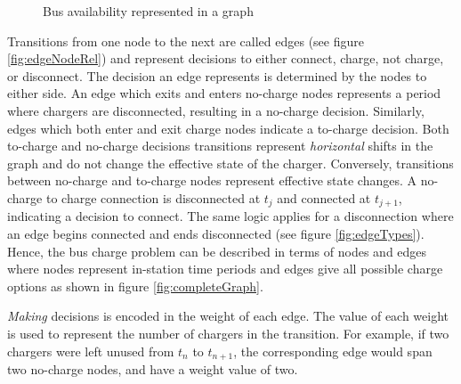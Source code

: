 \begin{figure*}
{
	}
		\caption{Bus availability represented in a graph}
		\label{fig:busAvailComparison}
\end{figure*}

\par Transitions from one node to the next are called edges (see figure \ref{fig:edgeNodeRel}) and represent decisions to either connect, charge, not charge, or disconnect. The decision an edge represents is determined by the nodes to either side. An edge which exits and enters no-charge nodes represents a period where chargers are disconnected, resulting in a no-charge decision. Similarly, edges which both enter and exit charge nodes indicate a to-charge decision. Both to-charge and no-charge decisions transitions represent \textit{horizontal} shifts in the graph and do not change the effective state of the charger. Conversely, transitions between no-charge and to-charge nodes represent effective state changes. A no-charge to charge connection is disconnected at $t_j$ and connected at $t_{j+1}$, indicating a decision to connect. The same logic applies for a disconnection where an edge begins connected and ends disconnected (see figure \ref{fig:edgeTypes}). Hence, the bus charge problem can be described in terms of nodes and edges where nodes represent in-station time periods and edges give all possible charge options as shown in figure \ref{fig:completeGraph}.
\par \textit{Making} decisions is encoded in the weight of each edge.  The value of each weight is used to represent the number of chargers in the transition. For example, if two chargers were left unused from $t_n$ to $t_{n+1}$, the corresponding edge would span two no-charge nodes, and have a weight value of two.

